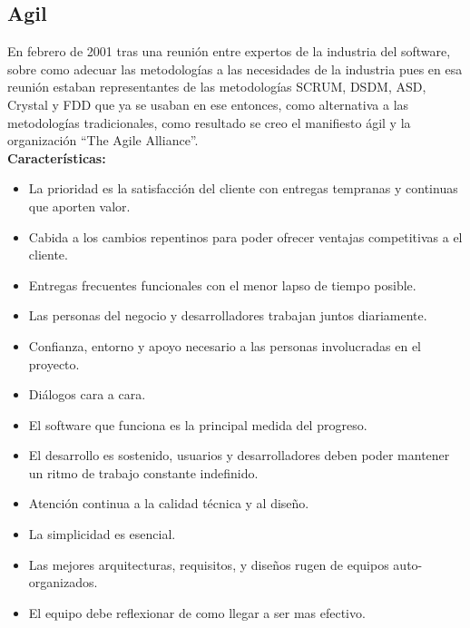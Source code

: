 \documentclass[spanish,12pt,letterpapper]{article}
\begin{document}
	\subsection{Agil}
	En febrero de 2001 tras una reunión entre expertos de la industria del software, sobre como adecuar las metodologías a las necesidades de la industria pues en esa reunión estaban representantes de las metodologías SCRUM, DSDM, ASD, Crystal y FDD que ya se usaban en ese entonces, como alternativa a las metodologías tradicionales, como resultado se creo el manifiesto ágil y la organización ``The Agile Alliance''.\\
	
	\textbf{Características:}
	\begin{itemize}
	\item La prioridad es la satisfacción del cliente con entregas tempranas y continuas que aporten valor.
	\item Cabida a los cambios repentinos para poder ofrecer ventajas competitivas a el cliente.
	\item Entregas frecuentes funcionales con el menor lapso de tiempo posible.
	\item Las personas del negocio y desarrolladores trabajan juntos diariamente.
	\item Confianza, entorno y apoyo necesario a las personas involucradas en el proyecto.
	\item Diálogos cara a cara.
	\item El software que funciona es la principal medida del progreso.
	\item El desarrollo es sostenido, usuarios y desarrolladores deben poder mantener un ritmo de trabajo constante indefinido.
	\item Atención continua a la calidad técnica y al diseño.
	\item La simplicidad es esencial.
	\item Las mejores arquitecturas, requisitos, y diseños rugen de equipos auto-organizados.
	\item El equipo debe reflexionar de como llegar a ser mas efectivo.
	\end{itemize}
	
\end{document}
